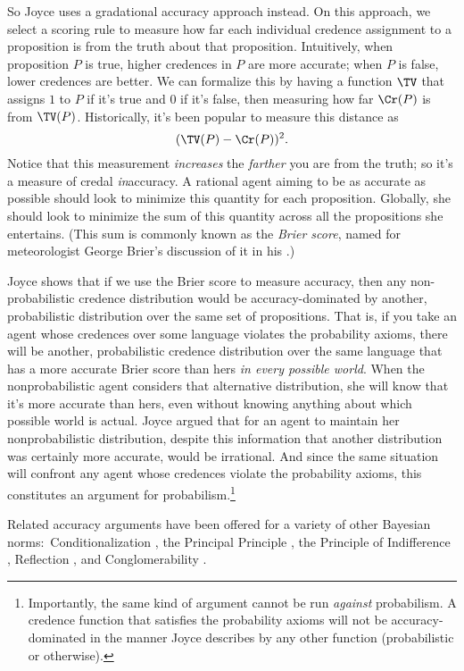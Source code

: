 So Joyce uses a gradational accuracy approach instead. On this approach, we select a scoring rule to measure how far each individual credence assignment to a proposition is from the truth about that proposition. Intuitively, when proposition $P$ is true, higher credences in $P$ are more accurate; when $P$ is false, lower credences are better. We can formalize this by having a function $\TV$ that assigns $1$ to $P$ if it's true and $0$ if it's false, then measuring how far $\Cr(P)$ is from $\TV(P)$. Historically, it's been popular to measure this distance as
\begin{equation}
(\TV(P)-\Cr(P))^2.
\end{equation}
Notice that this measurement \emph{increases} the \emph{farther} you are from the truth; so it's a measure of credal \emph{in}accuracy. A rational agent aiming to be as accurate as possible should look to minimize this quantity for each proposition. Globally, she should look to minimize the sum of this quantity across all the propositions she entertains. (This sum is commonly known as the \textit{Brier score}, named for meteorologist George Brier's discussion of it in his \citeyear{Brier}.)

Joyce shows that if we use the Brier score to measure accuracy, then any non-probabilistic credence distribution would be accuracy-dominated by another, probabilistic distribution over the same set of propositions. That is, if you take an agent whose credences over some language violates the probability axioms, there will be another, probabilistic credence distribution over the same language that has a more accurate Brier score than hers \emph{in every possible world}. When the nonprobabilistic agent considers that alternative distribution, she will know that it's more accurate than hers, even without knowing anything about which possible world is actual. Joyce argued that for an agent to maintain her nonprobabilistic distribution, despite this information that another distribution was certainly more accurate, would be irrational. And since the same situation will confront any agent whose credences violate the probability axioms, this constitutes an argument for probabilism.\footnote
{Importantly, the same kind of argument cannot be run \emph{against} probabilism. A credence function that satisfies the probability axioms will not be accuracy-dominated in the manner Joyce describes by any other function (probabilistic or otherwise).}

Related accuracy arguments have been offered for a variety of other Bayesian norms:\ Conditionalization \citep{GreavesWallace,BriggsPettigrew}, the Principal Principle \citep{PettigrewPrincipal}, the Principle of Indifference \citep{PettigrewIndifference}, Reflection \citep{EaswaranExpected}, and Conglomerability \citep{EaswaranExpected}.


